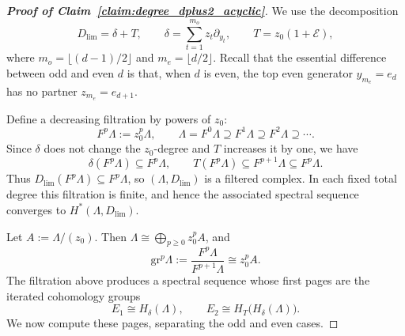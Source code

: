 \documentclass[10pt,a4paper]{amsart}
\begin{document}
\begin{proof}[\textnormal{\textbf{Proof of Claim~\ref{claim:degree_dplus2_acyclic}}}]
We use the decomposition
\begin{equation}
D_{\lim}=\delta+T,
\qquad
\delta=\sum_{t=1}^{m_o}z_t\partial_{y_t},
\qquad
T=z_0(1+\mathcal E),
\end{equation}
where $m_o=\lfloor (d-1)/2\rfloor$ and $m_e=\lfloor d/2\rfloor$. Recall that the essential difference between odd and even $d$ is that, when $d$ is even, the top even generator $y_{m_e}=e_d$ has no partner $z_{m_e}=e_{d+1}$.

\medskip

Define a decreasing filtration by powers of $z_0$:
\begin{equation}
F^p\Lambda:=z_0^p\Lambda,
\qquad
\Lambda=F^0\Lambda\supseteq F^1\Lambda\supseteq F^2\Lambda\supseteq \cdots .
\label{eq:z0_filtration}
\end{equation}
Since $\delta$ does not change the $z_0$-degree and $T$ increases it by one, we have
\begin{equation}
\delta(F^p\Lambda)\subseteq F^p\Lambda,
\qquad
T(F^p\Lambda)\subseteq F^{p+1}\Lambda\subseteq F^p\Lambda.
\end{equation}
Thus $D_{\lim}(F^p\Lambda)\subseteq F^p\Lambda$, so $(\Lambda,D_{\lim})$ is a filtered complex. In each fixed total degree this filtration is finite, and hence the associated spectral sequence converges to $H^*(\Lambda,D_{\lim})$.

\medskip

Let $A:=\Lambda/(z_0)$. Then $\Lambda\cong \bigoplus_{p\geq 0}z_0^p A$, and
\begin{equation}
\mathrm{gr}^p\Lambda:=\frac{F^p\Lambda}{F^{p+1}\Lambda}
\cong z_0^p A.
\label{eq:associated_graded_identification}
\end{equation}
\noindent The filtration above produces a spectral sequence whose first pages are the iterated cohomology groups
\begin{equation}
E_1\cong H_\delta(\Lambda),
\qquad
E_2\cong H_T\bigl(H_\delta(\Lambda)\bigr).
\label{eq:E1_E2_iterated}
\end{equation}
We now compute these pages, separating the odd and even cases.

\medskip


\end{proof}
\end{document}
